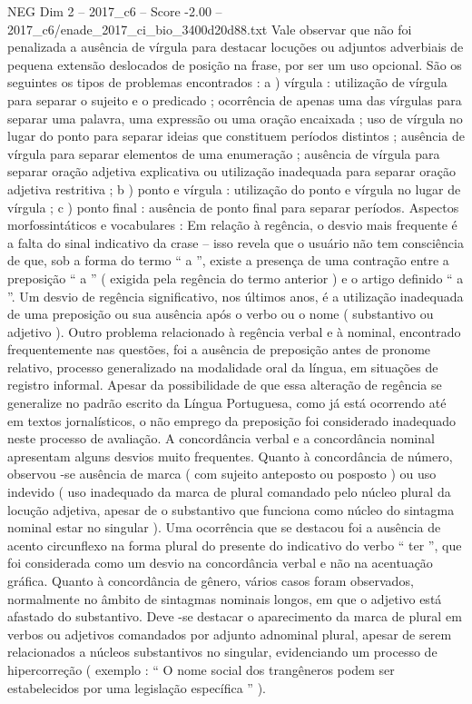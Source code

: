 \begin{textsample}{NEG Dim 2 – 2017\_c6 – Score -2.00 – 2017\_c6/enade\_2017\_ci\_bio\_3400d20d88.txt}
Vale observar que não foi penalizada a ausência de vírgula para destacar locuções ou adjuntos adverbiais de pequena extensão deslocados de posição na frase, por ser um uso opcional.
São os seguintes os tipos de problemas encontrados : a ) vírgula : utilização de vírgula para separar o sujeito e o predicado ; ocorrência de apenas uma das vírgulas para separar uma palavra, uma expressão ou uma oração encaixada ; uso de vírgula no lugar do ponto para separar ideias que constituem períodos distintos ; ausência de vírgula para separar elementos de uma enumeração ; ausência de vírgula para separar oração adjetiva explicativa ou utilização inadequada para separar oração adjetiva restritiva ; b ) ponto e vírgula : utilização do ponto e vírgula no lugar de vírgula ; c ) ponto final : ausência de ponto final para separar períodos.
Aspectos morfossintáticos e vocabulares : Em relação à regência, o desvio mais frequente é a falta do sinal indicativo da crase – isso revela que o usuário não tem consciência de que, sob a forma do termo “ a ”, existe a presença de uma contração entre a preposição “ a ” ( exigida pela regência do termo anterior ) e o artigo definido “ a ”.
Um desvio de regência significativo, nos últimos anos, é a utilização inadequada de uma preposição ou sua ausência após o verbo ou o nome ( substantivo ou adjetivo ).
Outro problema relacionado à regência verbal e à nominal, encontrado frequentemente nas questões, foi a ausência de preposição antes de pronome relativo, processo generalizado na modalidade oral da língua, em situações de registro informal.
Apesar da possibilidade de que essa alteração de regência se generalize no padrão escrito da Língua Portuguesa, como já está ocorrendo até em textos jornalísticos, o não emprego da preposição foi considerado inadequado neste processo de avaliação.
A concordância verbal e a concordância nominal apresentam alguns desvios muito frequentes.
Quanto à concordância de número, observou -se ausência de marca ( com sujeito anteposto ou posposto ) ou uso indevido ( uso inadequado da marca de plural comandado pelo núcleo plural da locução adjetiva, apesar de o substantivo que funciona como núcleo do sintagma nominal estar no singular ).
Uma ocorrência que se destacou foi a ausência de acento circunflexo na forma plural do presente do indicativo do verbo “ ter ”, que foi considerada como um desvio na concordância verbal e não na acentuação gráfica.
Quanto à concordância de gênero, vários casos foram observados, normalmente no âmbito de sintagmas nominais longos, em que o adjetivo está afastado do substantivo.
Deve -se destacar o aparecimento da marca de plural em verbos ou adjetivos comandados por adjunto adnominal plural, apesar de serem relacionados a núcleos substantivos no singular, evidenciando um processo de hipercorreção ( exemplo : “ O nome social dos trangêneros podem ser estabelecidos por uma legislação específica ” ).

\end{textsample}
